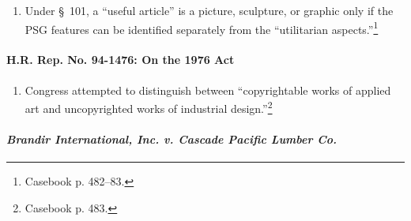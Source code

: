 \begin{enumerate}
    \item Under \S\ 101, a ``useful article'' is a picture, sculpture, or 
    graphic only if the PSG features can be identified separately from the 
    ``utilitarian aspects.''\footnote{Casebook p. 482--83.}
\end{enumerate}

\paragraph{H.R. Rep. No. 94-1476: On the 1976 Act}

\begin{enumerate}
    \item Congress attempted to distinguish between ``copyrightable works of 
    applied art and uncopyrighted works of industrial 
    design.''\footnote{Casebook p. 483.}
\end{enumerate}

\paragraph{\emph{Brandir International, Inc. v. Cascade Pacific Lumber Co.}}

